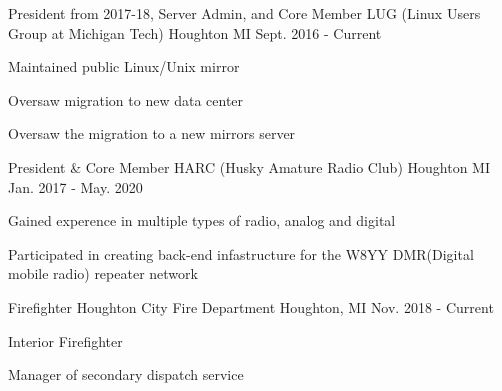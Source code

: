 

\begin{cventries}

  \cventry
    {President from 2017-18, Server Admin, and Core Member} %
    {LUG (Linux Users Group at Michigan Tech)} %
    {Houghton MI} %
    {Sept. 2016 - Current} %
    {
      \begin{cvitems} %
        \item {Maintained public Linux/Unix mirror}
        \item {Oversaw migration to new data center}
        \item {Oversaw the migration to a new mirrors server}
      \end{cvitems}
    }

  \cventry
    {President \& Core Member} %
    {HARC (Husky Amature Radio Club)} %
    {Houghton MI} %
    {Jan. 2017 - May. 2020} %
    {
      \begin{cvitems} %
        \item {Gained experence in multiple types of radio, analog and digital}
        \item {Participated in creating back-end infastructure for the W8YY DMR(Digital mobile radio) repeater network}
      \end{cvitems}
    }


  \cventry
    {Firefighter} %
    {Houghton City Fire Department} %
    {Houghton, MI} %
    {Nov. 2018 - Current} %
    {
      \begin{cvitems} %
        \item {Interior Firefighter}
        \item {Manager of secondary dispatch service}
      \end{cvitems}
    }



\end{cventries}
